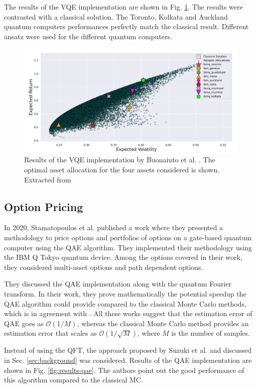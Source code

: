\documentclass[prx,twocolumn,floatfix,superscriptaddress,longbibliography]{revtex4-1}
\begin{document}
The results of the VQE implementation are shown in Fig. \ref{fig:results}. The results were contrasted with a classical solution. The Toronto, Kolkata and Auckland quantum computers performances perfectly match the classical result. Different ansatz were used for the different quantum computers. 
\begin{figure}[t!]
\centering
\includegraphics[width=.90\textwidth]{results-vqe.png}
  \caption{\label{fig:results} Results of the VQE implementation by Buonaiuto et al. \cite{Buonaiuto2023}. The optimal asset allocation for the four assets considered is shown. Extracted from 
  \cite{Buonaiuto2023}}
\end{figure}

\subsection{Option Pricing}
In 2020, Stamatopoulos et al. \cite{Stamatopoulos2020} published a work where they presented a methodology to price options and portfolios of options on a gate-based quantum computer using the QAE algorithm. They implemented their methodology using the IBM Q Tokyo quantum device. Among 
the options covered in their work, they considered multi-asset options and path dependent options.

They discussed the QAE implementation along with the quantum Fourier transform. In their work, they prove mathematically the potential speedup the QAE algorithm could provide compared to the classical Monte Carlo methods, which is in agreement with \cite{Woerner2019, Nakaji2020,Rebentrost2018, Rebentrost2022}. All these works suggest that the estimation error of QAE goes as $\mathcal{O}(1/M)$, whereas the classical Monte Carlo method provides an estimation error that scales as $\mathcal{O}(1/\sqrt{M})$, where $M$ is the number of samples.

Instead of using the QFT, the approach proposed by Suzuki et al. \cite{Suzuki2020} and discussed in Sec. \ref{sec:background} was considered.
Results of the QAE implementation are shown in Fig. \ref{fig:results-qae}. The authors point out the good performance of this algorithm compared to the classical MC.
\end{document}
